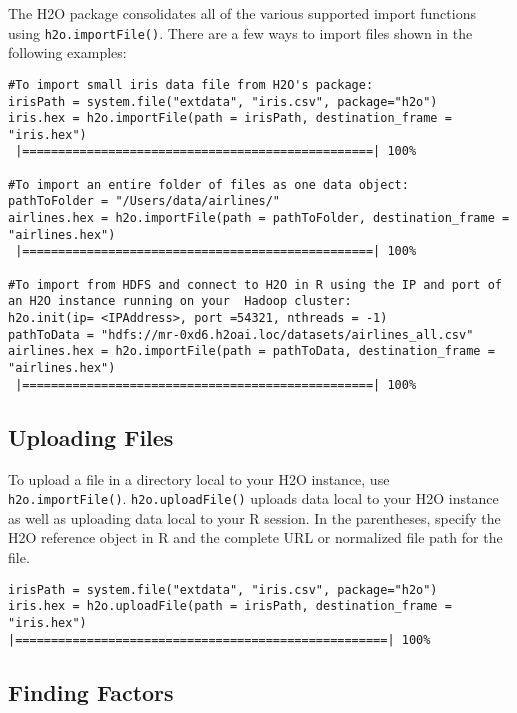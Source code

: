 {The H2O package consolidates all of the various supported import functions using {\texttt{h2o.importFile()}}. %
There are a few ways to import files shown in the following examples: 
\\
\begin{lstlisting}[style=R]
#To import small iris data file from H2O's package:
irisPath = system.file("extdata", "iris.csv", package="h2o")
iris.hex = h2o.importFile(path = irisPath, destination_frame = "iris.hex")
 |=================================================| 100%

#To import an entire folder of files as one data object:
pathToFolder = "/Users/data/airlines/"
airlines.hex = h2o.importFile(path = pathToFolder, destination_frame = "airlines.hex")
 |=================================================| 100%

#To import from HDFS and connect to H2O in R using the IP and port of an H2O instance running on your  Hadoop cluster:
h2o.init(ip= <IPAddress>, port =54321, nthreads = -1)
pathToData = "hdfs://mr-0xd6.h2oai.loc/datasets/airlines_all.csv"
airlines.hex = h2o.importFile(path = pathToData, destination_frame = "airlines.hex")
 |=================================================| 100%

\end{lstlisting}
\subsection{Uploading Files}

To upload a file in a directory local to your H2O instance, use {\texttt{h2o.importFile()}}.  {\texttt{h2o.uploadFile()}}  uploads data local to your H2O instance as well as uploading data local to your R session. In the parentheses, specify the H2O reference object in R and the complete URL or normalized file path for the file.

\begin{lstlisting}[style=R]
irisPath = system.file("extdata", "iris.csv", package="h2o")
iris.hex = h2o.uploadFile(path = irisPath, destination_frame = "iris.hex")
|====================================================| 100% 
\end{lstlisting}


\subsection{Finding Factors}

}
